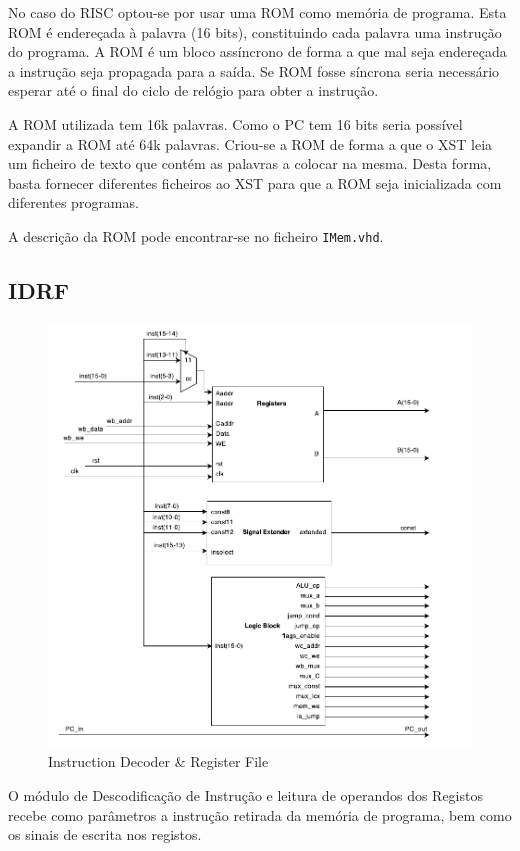 \documentclass[a4paper]{article}
\begin{document}
			No caso do \textmu RISC optou-se por usar uma ROM como memória de programa. Esta ROM é endereçada à palavra (16 bits), constituindo cada palavra uma instrução do programa. A ROM é um bloco assíncrono de forma a que mal seja endereçada a instrução seja propagada para a saída. Se ROM fosse síncrona seria necessário esperar até o final do ciclo de relógio para obter a instrução.
			
			A ROM utilizada tem 16k palavras. Como o PC tem 16 bits seria possível expandir a ROM até 64k palavras. Criou-se a ROM de forma a que o XST leia um ficheiro de texto que contém as palavras a colocar na mesma. Desta forma, basta fornecer diferentes ficheiros ao XST para que a ROM seja inicializada com diferentes programas.
			
			A descrição da ROM pode encontrar-se no ficheiro \texttt{IMem.vhd}.


		\subsection{IDRF}
			
			\begin{figure}[H]
				\centering
				\includegraphics[width=.8\textwidth]{img/idrf}
				\caption{Instruction Decoder \& Register File}
				\label{fig:idrf}
			\end{figure}
			
			O módulo de Descodificação de Instrução e leitura de operandos dos Registos recebe como parâmetros a instrução retirada da memória de programa, bem como os sinais de escrita nos registos.
			
\end{document}
